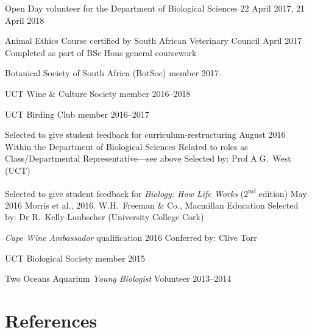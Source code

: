 \documentclass[10pt]{article}
\begin{document}
\begin{hangparas}{2em}{1}

Open Day volunteer for the Department of Biological Sciences
                                             \hfill 22 April 2017, 21 April 2018

Animal Ethics Course certified by South African Veterinary Council
                                                        \hfill April 2017 \break
Completed as part of BSc Hons general coursework

Botanical Society of South Africa (BotSoc) member                  \hfill 2017--

UCT Wine \& Culture Society member                             \hfill 2016--2018

UCT Birding Club member                                        \hfill 2016--2017

Selected to give student feedback for curriculum-restructuring
                                                       \hfill August 2016 \break
Within the Department of Biological Sciences                              \break
Related to roles as Class/Departmental Representative---see above         \break
Selected by: Prof A.G.~West (UCT)

Selected to give student feedback for \textit{Biology: How Life Works}
(2\textsuperscript{nd} edition)                           \hfill May 2016 \break
Morris et al., 2016. W.H.~Freeman \& Co., Macmillan Education             \break
Selected by: Dr R.~Kelly-Laubscher (University College Cork)

\textit{Cape Wine Ambassador} qualification                   \hfill 2016 \break
Conferred by: Clive Torr

UCT Biological Society member                                        \hfill 2015

Two Oceans Aquarium \textit{Young Biologist} Volunteer         \hfill 2013--2014

\hfill

\end{hangparas}

\section*{References} %
\end{document}
